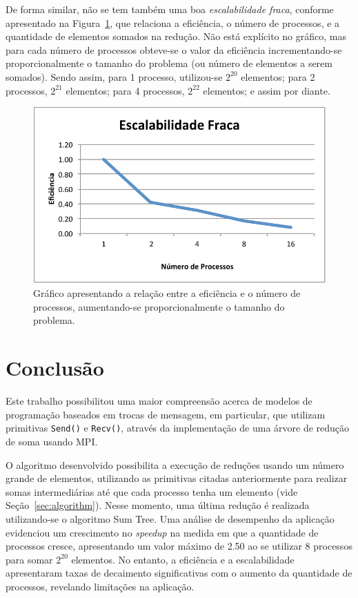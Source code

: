 \documentclass[12pt,a4paper]{article}
\begin{document}
De forma similar, não se tem também uma boa \emph{escalabilidade fraca},
conforme apresentado na Figura~\ref{fig:weak-scalability}, que relaciona a
eficiência, o número de processos, e a quantidade de elementos somados na
redução. Não está explícito no gráfico, mas para cada número de processos
obteve-se o valor da eficiência incrementando-se proporcionalmente o tamanho do
problema (ou número de elementos a serem somados). Sendo assim, para 1 processo,
utilizou-se $2^{20}$ elementos; para 2 processos, $2^{21}$ elementos; para 4
processos, $2^{22}$ elementos; e assim por diante.

\begin{figure}[h!]
\centering
\includegraphics{img/weak-scalability.pdf}
\caption{Gráfico apresentando a relação entre a eficiência e o número de
processos, aumentando-se proporcionalmente o tamanho do problema.}
\label{fig:weak-scalability}
\end{figure}

\pagebreak
\section{Conclusão}
Este trabalho possibilitou uma maior compreensão acerca de modelos de
programação baseados em trocas de mensagem, em particular, que utilizam
primitivas \texttt{Send()} e \texttt{Recv()}, através da implementação de uma
árvore de redução de soma usando MPI\@.

O algoritmo desenvolvido possibilita a execução de reduções usando um número
grande de elementos, utilizando as primitivas citadas anteriormente para
realizar somas intermediárias até que cada processo tenha um elemento (vide
Seção~\ref{sec:algorithm}). Nesse momento, uma última redução é realizada
utilizando-se o algoritmo Sum Tree. Uma análise de desempenho da aplicação
evidenciou um crescimento no \textit{speedup} na medida em que a quantidade de
processos cresce, apresentando um valor máximo de 2.50 ao se utilizar 8
processos para somar $2^{20}$ elementos. No entanto, a eficiência e a
escalabilidade apresentaram taxas de decaimento significativas com o aumento da
quantidade de processos, revelando limitações na aplicação.
\end{document}
